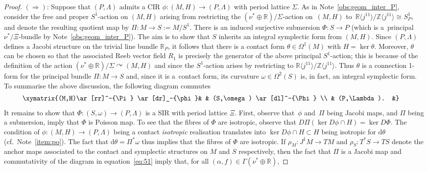 \documentclass[10pt,a4paper]{amsart}
\numberwithin{equation}{section}
\newcommand{\de}{\mathrm{d}} %
\newcommand{\CM}{(M,H)} %
\newcommand{\SM}{(S,\omega)} %
\newcommand{\PM}{(P,\Lambda)} %
\newcommand{\RR}{\mathbb{R}}
\newcommand{\ZZ}{\mathbb{Z}}
\begin{document}
\begin{proof}
\underline{$(\Rightarrow)$}: Suppose that $\PM$ admits a CIR $\phi \colon \CM \to \PM$ with period lattice $\Sigma$. As in Note~\ref{obs:geom_inter_P}, consider the free and proper $S^1$-action on $\CM$ arising from restricting the $(\nu^*\oplus \RR)/\Sigma$-action on~$\CM$ to~$\RR \langle j^11\rangle /\ZZ \langle j^11\rangle \cong S^1_P$, and denote the resulting quotient map by $\Pi \colon M \to S := M/S^1$. There is an induced surjective submersion $\Phi \colon S \to P$ (which is a~principal $\nu^*/\Xi$-bundle by Note~\ref{obs:geom_inter_P}). The aim is to show that $S$ inherits an integral symplectic form from $\CM$. Since $\PM$ def\/ines a Jacobi structure on the trivial line bundle $\RR_P$, it follows that there is a contact form $\theta \in \Omega^1(M)$ with $H = \ker \theta$. Moreover, $\theta$ can be chosen so that the associated Reeb vector f\/ield $R_1$ is precisely the generator of the above principal $S^1$-action; this is because of the def\/inition of the action $(\nu^*\oplus \RR)/\Sigma \curvearrowright \CM$ and since the $S^1$-action arises by restricting to $\RR \langle j^11\rangle /\ZZ \langle j^11\rangle$. Thus $\theta$ is a connection 1-form for the principal bundle $\Pi\colon M \to S$ and, since it is a~contact form, its curvature $\omega \in \Omega^2(S)$ is, in fact, an integral symplectic form. To summarise the above discussion, the following diagram commutes
 \begin{gather} \label{eq:51}\begin{split} &
 \xymatrix{\CM \ar[rr]^-{\Pi} \ar[dr]_-{\phi}& & \SM
 \ar[dl]^-{\Phi} \\
 & \PM. &}\end{split}
 \end{gather}
It remains to show that $\Phi \colon \SM \to \PM$ is a SIR with period lattice $\Xi$. First, observe that~$\phi$ and~$\Pi$ being Jacobi maps, and $\Pi$ being a submersion, imply that $\Phi$ is Poisson map. To see that the f\/ibres of $\Phi$ are isotropic, observe that $D\Pi( \ker D\phi \cap H) = \ker D \Phi$. The condition of $\phi \colon \CM \to \PM$ being a contact {\it isotropic} realisation translates into $\ker D\phi \cap H \subset H$ being isotropic for $\de \theta$ (cf.\ Note~\ref{item:po}). The fact that $\de \theta = \Pi^* \omega$ thus implies that the f\/ibres of $\Phi$ are isotropic. If $\rho_M \colon J^1M \to TM$ and $\rho_S \colon T^*S \to TS$ denote the anchor maps associated to the contact and symplectic structures on $M$ and $S$ respectively, then the fact that $\Pi$ is a Jacobi map and commutativity of the diagram in equation~\eqref{eq:51} imply that, for all $(\alpha,f) \in \Gamma(\nu^* \oplus \RR)$,

\end{proof}
\end{document}
